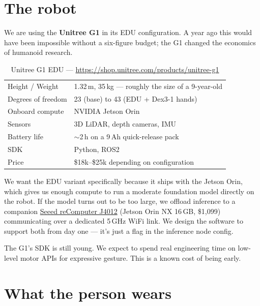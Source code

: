 \documentclass[11pt,a4paper]{article}
\begin{document}
\section{The robot}

We are using the \textbf{Unitree G1} in its EDU configuration. A year ago this would have been impossible without a six-figure budget; the G1 changed the economics of humanoid research.

\begin{table}[H]
\centering\small
\begin{tabularx}{\textwidth}{lX}
\toprule
Height / Weight & 1.32\,m, 35\,kg --- roughly the size of a 9-year-old \\
Degrees of freedom & 23 (base) to 43 (EDU + Dex3-1 hands) \\
Onboard compute & NVIDIA Jetson Orin \\
Sensors & 3D LiDAR, depth cameras, IMU \\
Battery life & $\sim$2\,h on a 9\,Ah quick-release pack \\
SDK & Python, ROS2 \\
Price & \$18k--\$25k depending on configuration \\
\bottomrule
\end{tabularx}
\caption*{Unitree G1 EDU --- \url{https://shop.unitree.com/products/unitree-g1}}
\end{table}

We want the EDU variant specifically because it ships with the Jetson Orin, which gives us enough compute to run a moderate foundation model directly on the robot. If the model turns out to be too large, we offload inference to a companion \href{https://www.seeedstudio.com/reComputer-J4012-p-5586.html}{Seeed reComputer J4012} (Jetson Orin NX 16\,GB, \$1,099) communicating over a dedicated 5\,GHz WiFi link. We design the software to support both from day one --- it's just a flag in the inference node config.

The G1's SDK is still young. We expect to spend real engineering time on low-level motor APIs for expressive gesture. This is a known cost of being early.

\section{What the person wears}
\end{document}

